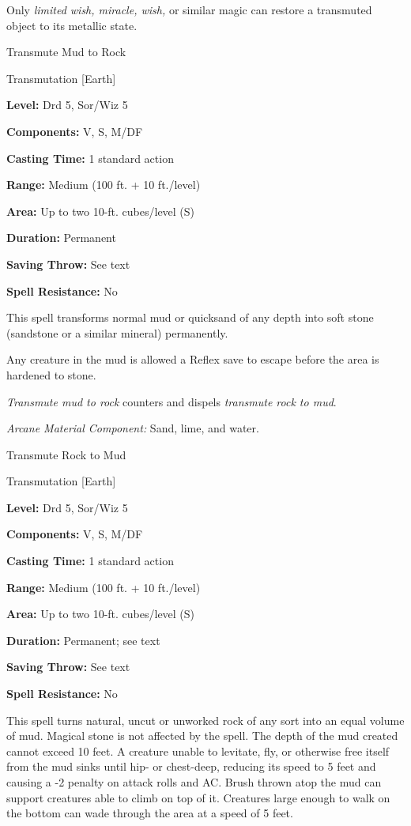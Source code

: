 \documentclass{article}
\begin{document}
Only \textit{limited wish, miracle, wish, }or similar magic can restore a transmuted 
object to its metallic state.

\vspace{12pt}
Transmute Mud to Rock

Transmutation [Earth]

\textbf{Level:} Drd 5, Sor/Wiz 5

\textbf{Components:} V, S, M/DF

\textbf{Casting Time:} 1 standard action

\textbf{Range: }Medium (100 ft. + 10 ft./level)

\textbf{Area:} Up to two 10-ft. cubes/level (S)

\textbf{Duration:} Permanent

\textbf{Saving Throw:} See text

\textbf{Spell Resistance:} No

This spell transforms normal mud or quicksand of any depth into soft stone (sandstone 
or a similar mineral) permanently.

Any creature in the mud is allowed a Reflex save to escape before the area is hardened 
to stone.

\textit{Transmute mud to rock }counters and dispels \textit{transmute rock to mud}.

\textit{Arcane Material Component: }Sand, lime, and water.

\vspace{12pt}
Transmute Rock to Mud

Transmutation [Earth]

\textbf{Level:} Drd 5, Sor/Wiz 5

\textbf{Components:} V, S, M/DF

\textbf{Casting Time:} 1 standard action

\textbf{Range: }Medium (100 ft. + 10 ft./level)

\textbf{Area:} Up to two 10-ft. cubes/level (S)

\textbf{Duration:} Permanent; see text

\textbf{Saving Throw:} See text

\textbf{Spell Resistance:} No

This spell turns natural, uncut or unworked rock of any sort into an equal volume 
of mud. Magical stone is not affected by the spell. The depth of the mud created 
cannot exceed 10 feet. A creature unable to levitate, fly, or otherwise free itself 
from the mud sinks until hip- or chest-deep, reducing its speed to 5 feet and causing 
a -2 penalty on attack rolls and AC. Brush thrown atop the mud can support creatures 
able to climb on top of it. Creatures large enough to walk on the bottom can wade 
through the area at a speed of 5 feet.
\end{document}
